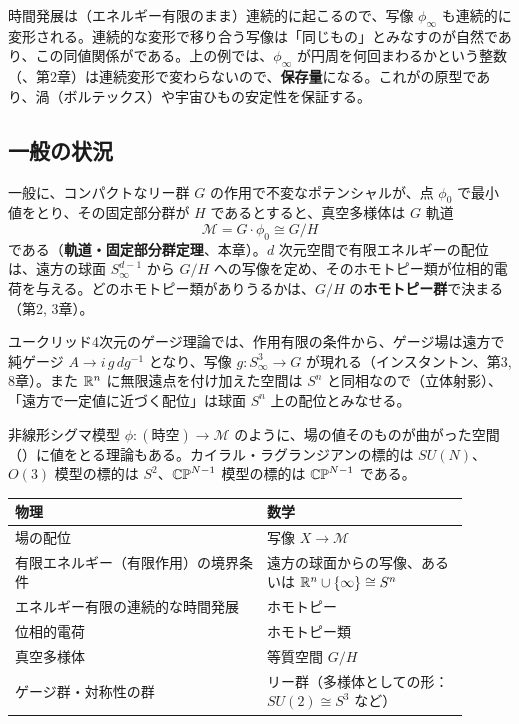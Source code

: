 時間発展は（エネルギー有限のまま）連続的に起こるので、写像 $\phi_\infty$ も連続的に変形される。連続的な変形で移り合う写像は「同じもの」とみなすのが自然であり、この同値関係がである。上の例では、$\phi_\infty$ が円周を何回まわるかという整数（、第2章）は連続変形で変わらないので、\textbf{保存量}になる。これがの原型であり、渦（ボルテックス）や宇宙ひもの安定性を保証する。

\subsection*{一般の状況}
一般に、コンパクトなリー群 $G$ の作用で不変なポテンシャルが、点 $\phi_0$ で最小値をとり、その固定部分群が $H$ であるとすると、真空多様体は $G$ 軌道
\[
\mathcal{M}=G\cdot\phi_0\cong G/H
\]
である（\textbf{軌道・固定部分群定理}、本章）。$d$ 次元空間で有限エネルギーの配位は、遠方の球面 $S^{d-1}_\infty$ から $G/H$ への写像を定め、そのホモトピー類が位相的電荷を与える。どのホモトピー類がありうるかは、$G/H$ の\textbf{ホモトピー群}で決まる（第2, 3章）。

ユークリッド4次元のゲージ理論では、作用有限の条件から、ゲージ場は遠方で純ゲージ $A\to i\,g\,dg^{-1}$ となり、写像 $g\colon S^3_\infty\to G$ が現れる（インスタントン、第3, 8章）。また $\mathbb{R}^n$ に無限遠点を付け加えた空間は $S^n$ と同相なので（立体射影）、「遠方で一定値に近づく配位」は球面 $S^n$ 上の配位とみなせる。

非線形シグマ模型 $\phi\colon(\text{時空})\to\mathcal{M}$ のように、場の値そのものが曲がった空間（）に値をとる理論もある。カイラル・ラグランジアンの標的は $SU(N)$、$O(3)$ 模型の標的は $S^2$、$\mathbb{CP}^{N-1}$ 模型の標的は $\mathbb{CP}^{N-1}$ である。

\begin{physbox}[：本章の辞書]
\begin{center}
\small
\begin{tabular}{p{0.5\linewidth}p{0.4\linewidth}}
物理 & 数学\\ \hline
場の配位 & 写像 $X\to\mathcal{M}$\\
有限エネルギー（有限作用）の境界条件 & 遠方の球面からの写像、あるいは $\mathbb{R}^n\cup\{\infty\}\cong S^n$\\
エネルギー有限の連続的な時間発展 & ホモトピー\\
位相的電荷 & ホモトピー類\\
真空多様体 & 等質空間 $G/H$\\
ゲージ群・対称性の群 & リー群（多様体としての形：$SU(2)\cong S^3$ など）
\end{tabular}
\end{center}
\end{physbox}

